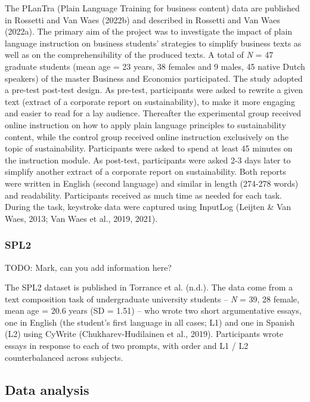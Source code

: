 \documentclass[
  english,
  man,floatsintext]{apa7}
\begin{document}
The PLanTra (Plain Language Training for business content) data are published in Rossetti and Van Waes (2022b) and described in Rossetti and Van Waes (2022a). The primary aim of the project was to investigate the impact of plain language instruction on business students' strategies to simplify business texts as well as on the comprehensibility of the produced texts. A total of \emph{N} = 47 graduate students (mean age = 23 years, 38 females and 9 males, 45 native Dutch speakers) of the master Business and Economics participated. The study adopted a pre-test post-test design. As pre-test, participants were asked to rewrite a given text (extract of a corporate report on sustainability), to make it more engaging and easier to read for a lay audience. Thereafter the experimental group received online instruction on how to apply plain language principles to sustainability content, while the control group received online instruction exclusively on the topic of sustainability. Participants were asked to spend at least 45 minutes on the instruction module. As post-test, participants were asked 2-3 days later to simplify another extract of a corporate report on sustainability. Both reports were written in English (second language) and similar in length (274-278 words) and readability. Participants received as much time as needed for each task. During the task, keystroke data were captured using InputLog (Leijten \& Van Waes, 2013; Van Waes et al., 2019, 2021).

\hypertarget{spl2}{%
\subsubsection{SPL2}\label{spl2}}

TODO: Mark, can you add information here?

The SPL2 dataset is published in Torrance et al. (n.d.). The data come from a text composition task of undergraduate university students -- \emph{N} = 39, 28 female, mean age = 20.6 years (SD = 1.51) -- who wrote two short argumentative essays, one in English (the student's first language in all cases; L1) and one in Spanish (L2) using CyWrite (Chukharev-Hudilainen et al., 2019). Participants wrote essays in response to each of two prompts, with order and L1 / L2 counterbalanced across subjects.

\hypertarget{data-analysis}{%
\subsection{Data analysis}\label{data-analysis}}
\end{document}
